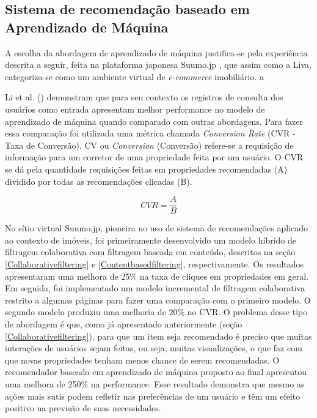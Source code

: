 \subsection{Sistema de recomendação baseado em Aprendizado de Máquina}
\label{sr_ml}

A escolha da abordagem de aprendizado de máquina justifica-se pela experiência descrita a seguir, feita na plataforma japonesa Suumo.jp \cite{Summo:2017}, que assim como a Liva, categoriza-se como um ambiente virtual de \textit{e-commerce} imobiliário.
a

Li et al. (\citeyear{Summo:2017}) demonstram que para seu contexto os registros de consulta dos usuários como entrada apresentam melhor performance no modelo de aprendizado de máquina quando comparado com outras abordagens. Para fazer essa comparação foi utilizada uma métrica chamada \textit{Conversion Rate} (CVR - Taxa de Conversão). CV ou \textit{Conversion} (Conversão) refere-se a requisição de informação para um corretor de uma propriedade feita por um usuário. O CVR se dá pela quantidade requisições feitas em propriedades recomendadas (A) dividido por todas as recomendações clicadas (B).

\begin{equation}
    CVR=\frac{A}{B}
\end{equation}

No sítio virtual Suumo.jp, pioneira no uso de sistema de recomendações aplicado ao contexto de imóveis, foi primeiramente desenvolvido um modelo híbrido de filtragem colaborativa com filtragem baseada em conteúdo, descritos na seção \ref{Collaborativefiltering} e \ref{Contentbasedfiltering}, respectivamente. Os resultados apresentaram uma melhora de 25\% na taxa de cliques em propriedades em geral. Em seguida, foi implementado um modelo incremental de filtragem colaborativa restrito a algumas páginas para fazer uma comparação com o primeiro modelo. O segundo modelo produziu uma melhoria de 20\% no CVR. O problema desse tipo de abordagem é que, como já apresentado anteriormente (seção \ref{Collaborativefiltering}), para que um item seja recomendado é preciso que muitas interações de usuários sejam feitas, ou seja, muitas visualizações, o que faz com que novas propriedades tenham menos chance de serem recomendadas. O recomendador baseado em aprendizado de máquina proposto ao final apresentou uma melhora de 250\% na performance. Esse resultado demonstra que mesmo as ações mais sutis podem refletir nas preferências de um usuário e têm um efeito positivo na previsão de suas necessidades.

